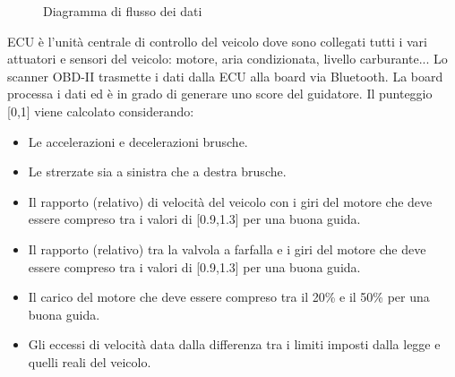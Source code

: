 \documentclass[12pt, a4paper, italian]{report}
\numberwithin{figure}{chapter}
\numberwithin{table}{chapter}
\begin{document}
\begin{figure}[h!]
\centering
{}
\caption{Diagramma di flusso dei dati}
\label{diagrammaFlussoProfilazione}
\end{figure}

\vspace{0.8cm}

ECU è l'unità centrale di controllo del veicolo dove sono collegati tutti i vari attuatori e sensori del veicolo: motore, aria condizionata, livello carburante... Lo scanner OBD-II trasmette i dati dalla ECU alla board via Bluetooth. La board processa i dati ed è in grado di generare uno score del guidatore. Il punteggio [0,1] viene calcolato considerando:

\begin{itemize}
    \item Le accelerazioni e decelerazioni brusche. \cite{fazeen2012safe}
    \item Le strerzate sia a sinistra che a destra brusche. \cite{fazeen2012safe}
    \item Il rapporto (relativo) di velocità del veicolo con i giri del motore che deve essere compreso tra i valori di [0.9,1.3] per una buona guida. \cite{chen2015driving}
    \item Il rapporto (relativo) tra la valvola a farfalla e i giri del motore che deve essere compreso tra i valori di [0.9,1.3] per una buona guida. \cite{chen2015driving}
    \item Il carico del motore che deve essere compreso tra il 20\% e il 50\% per una buona guida. \cite{chen2015driving}
    \item Gli eccessi di velocità data dalla differenza tra i limiti imposti dalla legge e quelli reali del veicolo.
\end{itemize}
\end{document}
